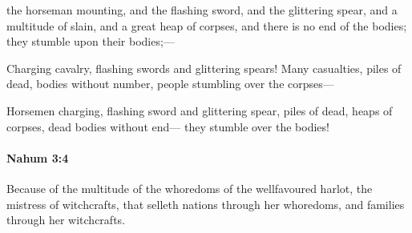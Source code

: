 			\begin{versebox}
					\item[BHS] 
					\item[LXX] 
					\item[ASV] the horseman mounting, and the flashing sword, and the glittering spear, and a multitude of slain, and a great heap of corpses, and there is no end of the bodies; they stumble upon their bodies;—
					\item[NIV] Charging cavalry, flashing swords and glittering spears! Many casualties, piles of dead, bodies without number, people stumbling over the corpses—
					\item[NRSV] Horsemen charging, flashing sword and glittering spear, piles of dead, heaps of corpses, dead bodies without end— they stumble over the bodies!
			\end{versebox}

		\paragraph{Nahum 3:4} %
			\label{NAHUM-3-4}

			Because of the multitude of the whoredoms of the wellfavoured harlot, the mistress of witchcrafts, that selleth nations through her whoredoms, and families through her witchcrafts.

